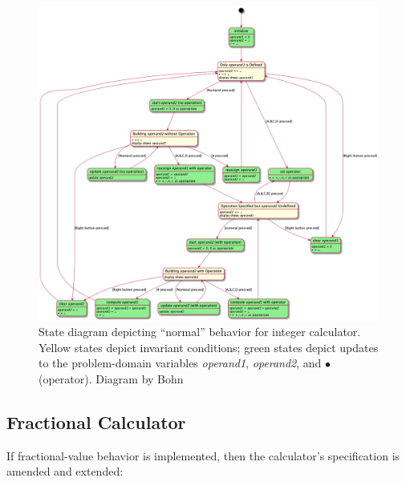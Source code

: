 \begin{figure}
    \centering
    \includegraphics[width=18cm]{CalculatorStateDiagram}
    \caption{\label{fig:StateDiagram} State diagram depicting ``normal''
        behavior for integer calculator. Yellow states depict invariant
        conditions; green states depict updates to the problem-domain variables
        \textit{operand1}, \textit{operand2}, and $\bullet$ (operator). \tiny
        Diagram by Bohn}
\end{figure}

\subsection*{Fractional Calculator}

If fractional-value behavior is implemented, then the calculator's
specification is amended and extended:

